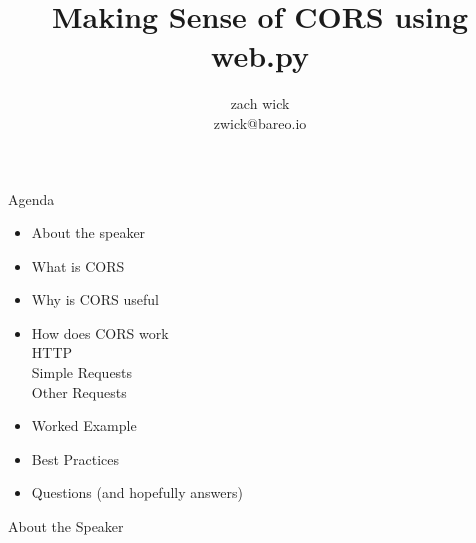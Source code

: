 \documentclass[11pt]{beamer}
\author{zach wick \\ zwick@bareo.io}
\title{Making Sense of CORS using web.py}
\begin{document}

\begin{frame}
  \titlepage
\end{frame}

\begin{frame}{Agenda}
  \begin{itemize}
  \item About the speaker\\
  \item What is CORS\\
  \item Why is CORS useful\\
  \item How does CORS work\\
    \subitem HTTP\\
    \subitem Simple Requests\\
    \subitem Other Requests\\
  \item Worked Example\\
  \item Best Practices\\
  \item Questions (and hopefully answers)
  \end{itemize}
\end{frame}

\begin{frame}{About the Speaker}

\end{frame}
\end{document}
